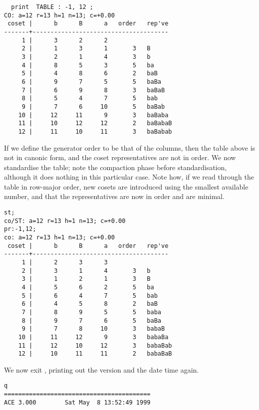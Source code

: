 \bv\begin{verbatim}
  print  TABLE : -1, 12 ;
CO: a=12 r=13 h=1 n=13; c=+0.00
 coset |      b      B      a   order   rep've
-------+--------------------------------------
     1 |      3      2      2
     2 |      1      3      1       3   B
     3 |      2      1      4       3   b
     4 |      8      5      3       5   ba
     5 |      4      8      6       2   baB
     6 |      9      7      5       5   baBa
     7 |      6      9      8       3   baBaB
     8 |      5      4      7       5   bab
     9 |      7      6     10       5   baBab
    10 |     12     11      9       3   baBaba
    11 |     10     12     12       2   baBabaB
    12 |     11     10     11       3   baBabab
\end{verbatim}\ev

If we define the generator order to be that of the columns, then the table
  above is not in canonic form, and the coset representatives are not in
  order.
We now standardise the table; note the compaction phase before
  standardisation, although it does nothing in this particular case.
Note how, if we read through the table in row-major order, new cosets
  are introduced using the smallest available number, and that the 
  representatives are now in order and are minimal.

\bv\begin{verbatim}
st;
co/ST: a=12 r=13 h=1 n=13; c=+0.00
pr:-1,12;
co: a=12 r=13 h=1 n=13; c=+0.00
 coset |      b      B      a   order   rep've
-------+--------------------------------------
     1 |      2      3      3
     2 |      3      1      4       3   b
     3 |      1      2      1       3   B
     4 |      5      6      2       5   ba
     5 |      6      4      7       5   bab
     6 |      4      5      8       2   baB
     7 |      8      9      5       5   baba
     8 |      9      7      6       5   baBa
     9 |      7      8     10       3   babaB
    10 |     11     12      9       3   babaBa
    11 |     12     10     12       3   babaBab
    12 |     10     11     11       2   babaBaB
\end{verbatim}\ev

We now exit \ace, printing out the version and the date \amp time again.

\bv\begin{verbatim}
q
=========================================
ACE 3.000        Sat May  8 13:52:49 1999
\end{verbatim}\ev

